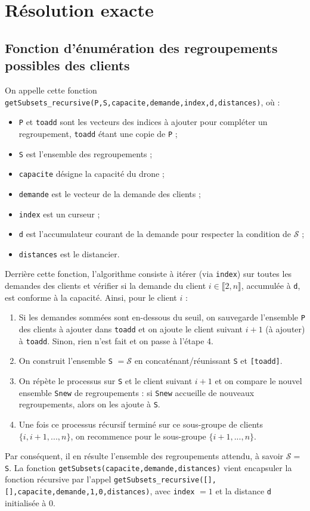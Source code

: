 \documentclass[french, 11pt, a4paper]{article} %
\newcommand{\Sc}{\mathcal{S}} %
\newcommand{\smb}{\smallbreak}
\begin{document}
\section{Résolution exacte}
\subsection{Fonction d'énumération des regroupements possibles des clients}
On appelle cette fonction \texttt{getSubsets\_recursive(P,S,capacite,demande,index,d,distances)},
où : \begin{itemize}
    \item \verb+P+ et \verb+toadd+ sont les vecteurs des indices à ajouter pour compléter un regroupement, \verb+toadd+ étant une copie de \verb+P+ ;
    \item \verb+S+ est l'ensemble des regroupements ;
    \item \verb+capacite+ désigne la capacité du drone ;
    \item \verb+demande+ est le vecteur de la demande des clients ;
    \item \verb+index+ est un curseur ;
    \item \verb+d+ est l'accumulateur courant de la demande pour respecter la condition de $\Sc$ ;
    \item \verb+distances+ est le distancier.
\end{itemize}

Derrière cette fonction, l'algorithme consiste à itérer (via \verb+index+) sur toutes les demandes des clients
et vérifier si la demande du client $i \in \llbracket 2,n \rrbracket$, accumulée à \verb+d+, est conforme à la capacité. Ainsi,
pour le client $i$ : 
\begin{enumerate}
    \item Si les demandes sommées sont en-dessous du seuil, on sauvegarde l'ensemble \verb+P+ des clients à ajouter dans \verb+toadd+
    et on ajoute le client suivant $i+1$ (à ajouter) à \verb+toadd+. Sinon, rien n'est fait et on passe à l'étape 4.
    \item On construit l'ensemble \verb+S+ $= \Sc$ en concaténant/réunissant \verb+S+ et \verb+[toadd]+.
    \item On répète le processus sur \verb+S+ et le client suivant $i+1$ et on compare le nouvel ensemble \verb+Snew+
    de regroupements : si \verb+Snew+ accueille de nouveaux regroupements, alors on les ajoute à \verb+S+.
    \item Une fois ce processus récursif terminé sur ce sous-groupe de clients $\{i,i+1,...,n\}$, on recommence pour le sous-groupe
$\{i+1,...,n\}$.
\end{enumerate}
\smb Par conséquent, il en résulte l'ensemble des regroupements attendu, à savoir $\Sc = $ \verb+S+.
\smb La fonction \texttt{getSubsets(capacite,demande,distances)} vient encapsuler la fonction récursive par l'appel
\texttt{getSubsets\_recursive([],[],capacite,demande,1,0,distances)}, avec \verb+index+ $=1$ et la distance \verb+d+ initialisée à $0$.
\end{document}
